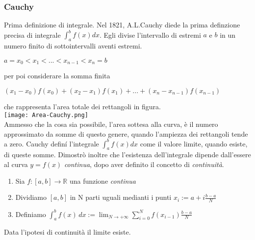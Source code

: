 \begin{frame}[label=Cauchy]
  \frametitle{Cauchy}

  \begin{block}{Prima definizione di integrale.} 
    Nel 1821, A.L.Cauchy diede la prima definzione precisa di integrale 
    $\int_{a}^bf(x)dx$. Egli divise l'intervallo di estremi $a$ e $b$ 
    in un numero finito di sottointervalli aventi estremi.
    \begin{center}
      $a = x_0 < x_1 < ... < x_{n-1} < x_n = b$
    \end{center} 
    per poi considerare la somma finita
    \begin{center}
      $(x_1 - x_0)f(x_0) + (x_2-x_1)f(x_1) + ... + (x_n - x_{n-1})f(x_{n-1}) $
    \end{center}
    che rappresenta l'area totale dei rettangoli in figura.\\
    \texttt{[image: Area-Cauchy.png]}
    \\
    \alert{Ammesso che la cosa sia possibile}, l'area sottesa alla curva,
    è il numero approssimato da somme di questo genere, quando l'ampiezza dei rettangoli
    tende a zero. 
    Cauchy definí l'integrale $\int_{a}^bf(x)dx$ come il valore limite, quando esiste,
    di queste somme.
    Dimostrò inoltre che l'esistenza dell'integrale dipende dall'essere al curva $y=f(x)$ \textit{continua},
    dopo aver definito il concetto di \textit{continuità}.
  \end{block}
\end{frame}

\begin{frame}
  \begin{enumerate}
    \item Sia $f: [a,b] \rightarrow \mathbb{R}$ una funzione \textit{continua}
    \item Dividiamo $[a,b]$ in N parti uguali medianti i punti $x_i := a + i\frac{b-a}{N}$ 
    \item Definiamo $\int_{a}^{b} f(x) \,dx := \lim_{N \to +\infty}\sum_{i=0}^{N} f(x_{i-1}) \frac{b-a}{N}$      
  \end{enumerate}

  Data l'ipotesi di continuità il limite esiste.
\end{frame}


